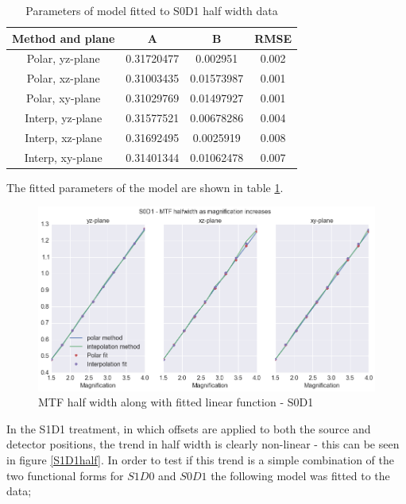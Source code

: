 \documentclass[
  twoside,
  11pt, a4paper,
  footinclude=true,
  headinclude=true,
  cleardoublepage=empty
]{scrbook}
\begin{document}
\begin{table}
\caption{Parameters of model fitted to S0D1 half width data}
\label{linhalffit}
\begin{tabular}{c|ccc}
\toprule
{} Method and plane &     A &     B &  RMSE\\
\midrule
Polar, yz-plane         &  0.31720477 & 0.002951    & 0.002\\
Polar, xz-plane        &  0.31003435 & 0.01573987 &  0.001\\
Polar, xy-plane      &  0.31029769 & 0.01497927 &  0.001\\
Interp, yz-plane       &  0.31577521 & 0.00678286 &  0.004\\
Interp, xz-plane       &  0.31692495 & 0.0025919 &  0.008\\
Interp, xy-plane       &  0.31401344 & 0.01062478 &  0.007\\
\bottomrule
\end{tabular}
\end{table}

The fitted parameters of the model are shown in table \ref{linhalffit}.

\begin{figure}[h!]
  \centering
    \includegraphics[width=\textwidth]{code/MTF_and_PSF/MTF_Interp_Polar_Plots_files/MTF_Interp_Polar_Plots_7_0.png}
    \caption{MTF half width along with fitted linear function - S0D1}
        \label{S0D1half}
\end{figure}

In the S1D1 treatment, in which offsets are applied to both the source and detector positions, the trend in half width is clearly non-linear - this can be seen in figure \ref{S1D1half}. In order to test if this trend is a simple combination of the two functional forms for $S1D0$ and $S0D1$ the following model was fitted to the data;
\end{document}
